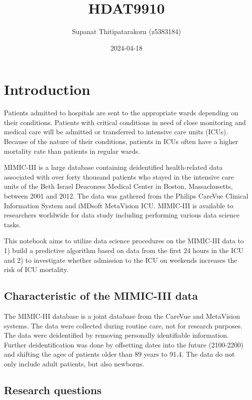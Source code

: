 \documentclass[
]{article}
\title{HDAT9910}
\author{Supanat Thitipatarakorn (z5383184)}
\date{2024-04-18}
\begin{document}
\maketitle

\hypertarget{introduction}{%
\section{Introduction}\label{introduction}}

Patients admitted to hospitals are sent to the appropriate wards
depending on their conditions. Patients with critical conditions in need
of close monitoring and medical care will be admitted or transferred to
intensive care units (ICUs). Because of the nature of their conditions,
patients in ICUs often have a higher mortality rate than patients in
regular wards.

MIMIC-III is a large database containing deidentified health-related
data associated with over forty thousand patients who stayed in the
intensive care units of the Beth Israel Deaconess Medical Center in
Boston, Massachusetts, between 2001 and 2012. The data was gathered from
the Philips CareVue Clinical Information System and iMDsoft MetaVision
ICU. MIMIC-III is available to researchers worldwide for data study
including performing various data science tasks.

This notebook aims to utilize data science procedures on the MIMIC-III
data to 1) build a predictive algorithm based on data from the first 24
hours in the ICU and 2) to investigate whether admission to the ICU on
weekends increases the risk of ICU mortality.

\hypertarget{characteristic-of-the-mimic-iii-data}{%
\subsection{Characteristic of the MIMIC-III
data}\label{characteristic-of-the-mimic-iii-data}}

The MIMIC-III database is a joint database from the CareVue and
MetaVision systems. The data were collected during routine care, not for
research purposes. The data were deidentified by removing personally
identifiable information. Further deidentification was done by
offsetting dates into the future (2100-2200) and shifting the ages of
patients older than 89 years to 91.4. The data do not only include adult
patients, but also newborns.

\hypertarget{research-questions}{%
\subsection{Research questions}\label{research-questions}}
\end{document}
